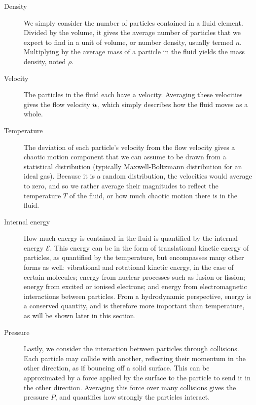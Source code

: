 \begin{description}
    \item[Density] We simply consider the number of particles contained in a fluid element. Divided by the volume, it gives the average number of particles that we expect to find in a unit of volume, or number density, usually termed \(n\). Multiplying by the average mass of a particle in the fluid yields the mass density, noted \(\rho\).

    \item[Velocity] The particles in the fluid each have a velocity. Averaging these velocities gives the flow velocity \(\boldsymbol{u}\), which simply describes how the fluid moves as a whole.

    \item[Temperature] The deviation of each particle's velocity from the flow velocity gives a chaotic motion component that we can assume to be drawn from a statistical distribution (typically Maxwell-Boltzmann distribution for an ideal gas). Because it is a random distribution, the velocities would average to zero, and so we rather average their magnitudes to reflect the temperature \(T\) of the fluid, or how much chaotic motion there is in the fluid.

    \item[Internal energy] How much energy is contained in the fluid is quantified by the internal energy \(\mathcal{E}\). This energy can be in the form of translational kinetic energy of particles, as quantified by the temperature, but encompasses many other forms as well: vibrational and rotational kinetic energy, in the case of certain molecules; energy from nuclear processes such as fusion or fission; energy from excited or ionised electrons; and energy from electromagnetic interactions between particles. From a hydrodynamic perspective, energy is a conserved quantity, and is therefore more important than temperature, as will be shown later in this section.

    \item[Pressure] Lastly, we consider the interaction between particles through collisions. Each particle may collide with another, reflecting their momentum in the other direction, as if bouncing off a solid surface. This can be approximated by a force applied by the surface to the particle to send it in the other direction. Averaging this force over many collisions gives the pressure \(P\), and quantifies how strongly the particles interact.
\end{description}


